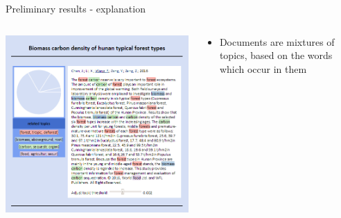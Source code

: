 \documentclass[9pt]{beamer}
\begin{document}
\begin{frame}{Preliminary results - explanation}

\begin{columns}
	\begin{column}{0.5\linewidth}
		\begin{center}
			\includegraphics[width=\linewidth]{../plots/biomass_eg.png}
		\end{center}
	\end{column}
	\begin{column}{0.5\linewidth}
		\begin{center}
			\begin{itemize}
				\item Documents are mixtures of topics, based on the words which occur in them
			\end{itemize}
		\end{center}
	\end{column}
\end{columns}

\end{frame}
\end{document}
